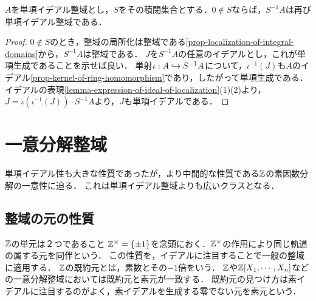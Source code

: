 \documentclass[uplatex,dvipdfmx]{jsreport}
\begin{document}
\begin{proposition}
    $A$を単項イデアル整域とし，$S$をその積閉集合とする．$0\notin S$ならば，$S^{-1}A$は再び単項イデアル整域である．
\end{proposition}
\begin{proof}
    $0\notin S$のとき，整域の局所化は整域である\ref{prop-localization-of-integral-domains}から，$S^{-1}A$は整域である．
    $J$を$S^{-1}A$の任意のイデアルとし，これが単項生成であることを示せば良い．
    単射$\iota:A\hookrightarrow S^{-1}A$について，$\iota^{-1}(J)$も$A$のイデアル\ref{prop-kernel-of-ring-homomorphism}であり，したがって単項生成である．
    イデアルの表現\ref{lemma-expression-of-ideal-of-localization}(1)(2)より，$J=\iota(\iota^{-1}(J))\cdot S^{-1}A$より，$J$も単項イデアルである．
\end{proof}

\section{一意分解整域}

\begin{tcolorbox}[colframe=ForestGreen, colback=ForestGreen!10!white,breakable,colbacktitle=ForestGreen!40!white,coltitle=black,fonttitle=\bfseries\sffamily,
title=]
    単項イデアル性も大きな性質であったが，より中間的な性質である$\mathbb{Z}$の素因数分解の一意性に迫る．
    これは単項イデアル整域よりも広いクラスとなる．
\end{tcolorbox}

\subsection{整域の元の性質}

\begin{tcolorbox}[colframe=ForestGreen, colback=ForestGreen!10!white,breakable,colbacktitle=ForestGreen!40!white,coltitle=black,fonttitle=\bfseries\sffamily,
title=]
    $\mathbb{Z}$の単元は２つであること
    $\mathbb{Z}^\times=\{\pm 1\}$を念頭におく．$\mathbb{Z}^\times$の作用により同じ軌道の属する元を同伴という．
    この性質を，イデアルに注目することで一般の整域に適用する．
    $\mathbb{Z}$の既約元とは，素数とその$-1$倍をいう．
    $\mathbb{Z}$や$\mathbb{Z}[X_1,\cdots,X_n]$などの一意分解整域においては既約元と素元が一致する．
    既約元の見つけ方は素イデアルに注目するのがよく，素イデアルを生成する零でない元を素元という．
\end{tcolorbox}
\end{document}
